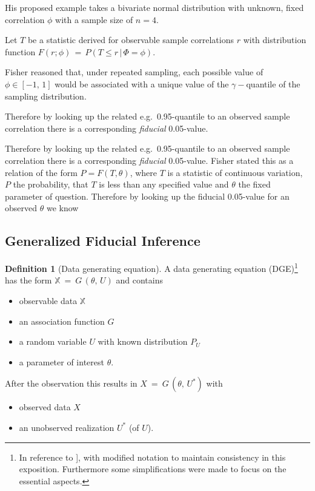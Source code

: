 \documentclass[
]{report}
\theoremstyle{definition}
\theoremstyle{definition}
\newtheorem{definition}{Definition}[section]
\begin{document}
His proposed example takes a bivariate normal distribution with unknown,
fixed correlation \(\phi\) with a sample size of \(n=4\).

Let \(T\) be a statistic derived for observable sample correlations
\(r\) with distribution function
\(F(r; \phi) \, = \, P(T \leq r \, | \, \Phi = \phi)\).

Fisher reasoned that, under repeated sampling, each possible value of
\(\phi \in [-1,\,1]\) would be associated with a unique value of the
\(\gamma-\)quantile of the sampling distribution.

Therefore by looking up the related e.g.~0.95-quantile to an observed
sample correlation there is a corresponding \textit{fiducial}
0.05-value.

Therefore by looking up the related e.g.~0.95-quantile to an observed
sample correlation there is a corresponding \textit{fiducial}
0.05-value. Fisher stated this as a relation of the form
\(P = F(T, \theta)\), where \(T\) is a statistic of continuous
variation, \(P\) the probability, that \(T\) is less than any specified
value and \(\theta\) the fixed parameter of question. Therefore by
looking up the fiducial 0.05-value for an observed \(\theta\) we know

\subsection{Generalized Fiducial Inference}

\begin{definition}[Data generating equation]
A data generating equation (DGE)\footnote{In reference to \cite[Chapters 6.4.1.2 and 13.1]{berger_handbook_2024}], with modified notation to maintain consistency in this exposition. Furthermore some simplifications were made to focus on the essential aspects.} has the form $\mathbb{X} \ = \  G \, (\theta, \, U)$ and contains
\begin{itemize}
  \item observable data $\mathbb{X}$
  \item an association function $G$
  \item a random variable $U$ with known distribution $P_U$
  \item a parameter of interest $\theta$.
\end{itemize}
After the observation this results in $X \ = \ G \, (\theta, \, U^*)$ with
\begin{itemize}
  \item observed data $X$
  \item an unobserved realization $U^*$ (of $U$).
\end{itemize}
\end{definition}
\end{document}
